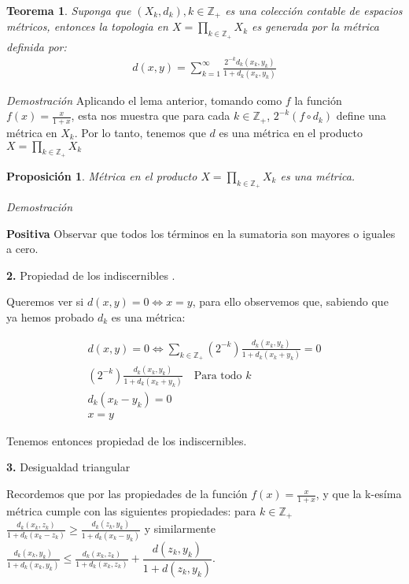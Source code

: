 \documentclass[]{article}
\newtheorem{thm}{Teorema}
\newtheorem{prop}{Proposición}
\newcommand{\lrp}[1]{\left( #1 \right)}
\newcommand{\ZZ}{\mathbb{Z}}
\newcommand{\qt}[1]{\textrm{#1}}
\begin{document}
\begin{thm}
	Suponga que $ (X_k,d_k), k \in \ZZ_+ $ es una colección  contable de espacios métricos, entonces la topologia en $ X = \prod_{k \in \ZZ_+}^{} X_k $ es generada por la métrica definida por:
	\begin{align} \label{newmetric}
	d(x,y) = \sum_{k =1}^{\infty} \frac{2^{-k} d_k(x_k,y_k)}{1 + d_k(x_k,y_k)}  
	\end{align} 
\end{thm}

\textit{Demostración} Aplicando el lema anterior, tomando como $f$ la función $f(x) = \frac{x}{1+x} $, esta nos muestra que para cada $ k \in \ZZ_+ $, $ 2^{-k}(f \circ d_k) $ define una métrica en $ X_k $. Por lo tanto, tenemos que $ d $ es una métrica en el producto $ X = \prod_{k \in \ZZ_+}^{}X_k $

\begin{prop}
Métrica en el producto $ X = \prod_{k \in \ZZ_+}^{}X_k $ es una métrica.
\end{prop}

\textit{Demostración}

\textbf{Positiva}
Observar que todos los términos en la sumatoria son mayores o iguales a cero. 

\textbf{2.} Propiedad de los indiscernibles .

Queremos ver si $ d(x,y) = 0 \iff x = y $, para ello observemos que, sabiendo que ya hemos probado $ d_k $ es una métrica:

\begin{align*}
d(x,y) = 0 \iff \sum_{k \in \ZZ_+} \lrp{2^{-k}} \frac{d_k(x_k,y_k)}{1 + d_k(x_k+y_k)} = 0  \\
\lrp{2^{-k}} \frac{d_k(x_k,y_k)}{1 + d_k(x_k+y_k)} \quad \qt{Para todo } k\\
d_k(x_k - y_k) = 0 \\
x = y
\end{align*}

Tenemos entonces propiedad de los indiscernibles.

\textbf{3.} Desigualdad triangular

Recordemos que por las propiedades de la función $ f(x) = \frac{x}{1+x} $, y que la k-esíma métrica cumple con las siguientes propiedades: para $k \in \ZZ_+ $ $ \frac{d_k(x_k,z_k)}{1+ d_k(x_k - z_k)} \geq \frac{d_k(z_k,y_k)}{1 + d_k(x_k - y_k)} $ y similarmente $ \frac{d_k(x_k,y_k)}{1 + d_k(x_k,y_k)} \leq \frac{d_k(x_k,z_k)}{1 + d_k(x_k,z_k)} + \dfrac{d(z_k,y_k)}{1 + d(z_k,y_k)}  $.
\end{document}
